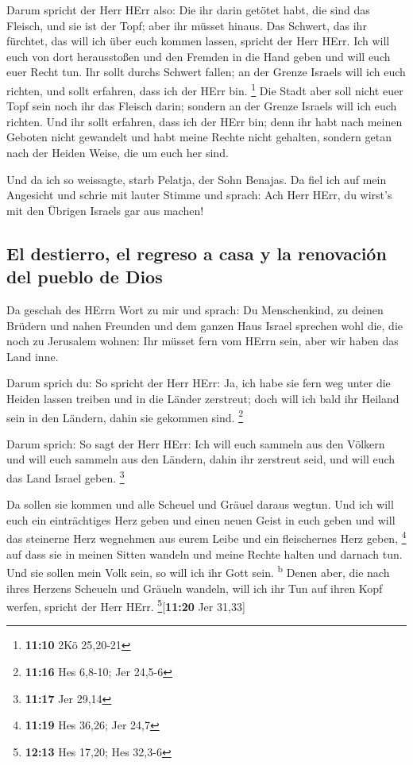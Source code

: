  Darum spricht der Herr HErr also: Die ihr darin getötet
habt, die sind das Fleisch, und sie ist der Topf; aber ihr müsset
hinaus.  Das Schwert, das ihr fürchtet, das will ich über
euch kommen lassen, spricht der Herr HErr.  Ich will euch
von dort herausstoßen und den Fremden in die Hand geben und will euch
euer Recht tun.  Ihr sollt durchs Schwert fallen; an der
Grenze Israels will ich euch richten, und sollt erfahren, dass ich der
HErr bin. \footnote{\textbf{11:10} 2Kö 25,20-21}  Die
Stadt aber soll nicht euer Topf sein noch ihr das Fleisch darin; sondern
an der Grenze Israels will ich euch richten.  Und ihr
sollt erfahren, dass ich der HErr bin; denn ihr habt nach meinen Geboten
nicht gewandelt und habt meine Rechte nicht gehalten, sondern getan nach
der Heiden Weise, die um euch her sind.

 Und da ich so weissagte, starb Pelatja, der Sohn
Benajas. Da fiel ich auf mein Angesicht und schrie mit lauter Stimme und
sprach: Ach Herr HErr, du wirst's mit den Übrigen Israels gar aus
machen!

\hypertarget{el-destierro-el-regreso-a-casa-y-la-renovaciuxf3n-del-pueblo-de-dios}{%
\subsection{El destierro, el regreso a casa y la renovación del pueblo
de
Dios}\label{el-destierro-el-regreso-a-casa-y-la-renovaciuxf3n-del-pueblo-de-dios}}

 Da geschah des HErrn Wort zu mir und sprach:
 Du Menschenkind, zu deinen Brüdern und nahen Freunden
und dem ganzen Haus Israel sprechen wohl die, die noch zu Jerusalem
wohnen: Ihr müsset fern vom HErrn sein, aber wir haben das Land inne.

 Darum sprich du: So spricht der Herr HErr: Ja, ich habe
sie fern weg unter die Heiden lassen treiben und in die Länder
zerstreut; doch will ich bald ihr Heiland sein in den Ländern, dahin sie
gekommen sind. \footnote{\textbf{11:16} Hes 6,8-10; Jer 24,5-6}

 Darum sprich: So sagt der Herr HErr: Ich will euch
sammeln aus den Völkern und will euch sammeln aus den Ländern, dahin ihr
zerstreut seid, und will euch das Land Israel geben. \footnote{\textbf{11:17}
  Jer 29,14}

 Da sollen sie kommen und alle Scheuel und Gräuel daraus
wegtun.  Und ich will euch ein einträchtiges Herz geben
und einen neuen Geist in euch geben und will das steinerne Herz
wegnehmen aus eurem Leibe und ein fleischernes Herz geben, \footnote{\textbf{11:19}
  Hes 36,26; Jer 24,7}  auf dass sie in meinen Sitten
wandeln und meine Rechte halten und darnach tun. Und sie sollen mein
Volk sein, so will ich ihr Gott sein. \textsuperscript{b}
 Denen aber, die nach ihres Herzens Scheueln und Gräueln
wandeln, will ich ihr Tun auf ihren Kopf werfen, spricht der Herr HErr.
\footnote{\textbf{12:13} Hes 17,20; Hes 32,3-6}{[}\textbf{11:20} Jer
31,33{]}

